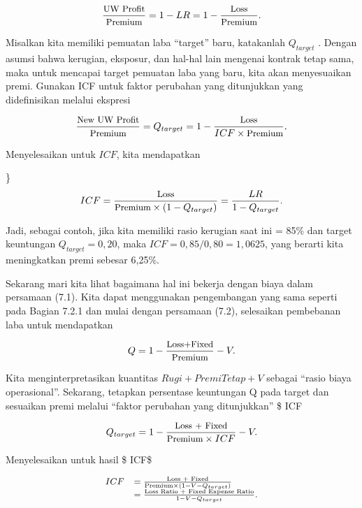 \documentclass[
]{book}
\begin{document}
\begin{equation}
\small{
\frac{\text{UW Profit}}{\text{Premium}} = 1 - LR = 1 - \frac{\text{Loss}}{\text{Premium}} .
}
\end{equation}

Misalkan kita memiliki pemuatan laba ``target'' baru, katakanlah \(Q_{target}\) . Dengan asumsi bahwa kerugian, eksposur, dan hal-hal lain mengenai kontrak tetap sama, maka untuk mencapai target pemuatan laba yang baru, kita akan menyesuaikan premi. Gunakan ICF untuk faktor perubahan yang ditunjukkan yang didefinisikan melalui ekspresi

\begin{equation}
\small{
\frac{\text{New UW Profit}}{\text{Premium}} = Q_{target} =  1 - \frac{\text{Loss}}{ICF \times \text{Premium}}.
}
\end{equation}

Menyelesaikan untuk \(ICF\), kita mendapatkan

\}\begin{equation}
\small{
ICF =  \frac{\text{Loss}}{\text{Premium} \times (1-Q_{target})} = \frac{LR}{1-Q_{target}}.
}
\end{equation}

Jadi, sebagai contoh, jika kita memiliki rasio kerugian saat ini = 85\% dan target keuntungan \(Q_{target} = 0,20\), maka \(ICF = 0,85/0,80 = 1,0625\), yang berarti kita meningkatkan premi sebesar 6,25\%.

Sekarang mari kita lihat bagaimana hal ini bekerja dengan biaya dalam persamaan (7.1). Kita dapat menggunakan pengembangan yang sama seperti pada Bagian 7.2.1 dan mulai dengan persamaan (7.2), selesaikan pembebanan laba untuk mendapatkan

\begin{equation}
\small{
Q = 1 - \frac{\text{Loss+Fixed}}{\text{Premium}} - V .
}
\end{equation}

Kita menginterpretasikan kuantitas \(Rugi + Premi Tetap + V\) sebagai ``rasio biaya operasional''. Sekarang, tetapkan persentase keuntungan Q pada target dan sesuaikan premi melalui ``faktor perubahan yang ditunjukkan'' \$ ICF

\begin{equation}
\small{
Q_{target} = 1
-\frac{\text{Loss + Fixed}}{\text{Premium}\times ICF} - V .
}
\end{equation}

Menyelesaikan untuk hasil \$ ICF\$

\begin{equation}
{\small
\begin{array}{ll}
ICF &= \frac{\text{Loss + Fixed}}{\text{Premium} \times (1 - V - Q_{target})} \\
&= \frac{\text{Loss Ratio + Fixed Expense Ratio}}{1 - V - Q_{target}} .
\end{array}
}
\end{equation}
\end{document}
